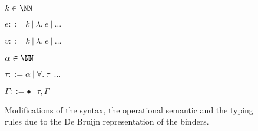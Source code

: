 \begin{figure}[ht]

  $k \in \NN$

  $e ::= k\ |\ \lambda.\ e\ |\ \ldots$

  $v ::= k\ |\ \lambda.\ e\ |\ \ldots$

  $\alpha \in \NN$

  $\tau ::= \alpha\ |\ \forall.\ \tau |\ \ldots$

  $\Gamma ::= \bullet\ |\ \tau,\Gamma$

  \centering


  \caption{\label{fig:opsemDB} Modifications of the syntax, the operational semantic and the typing rules due to the De Bruijn representation of the binders.}
\end{figure}
